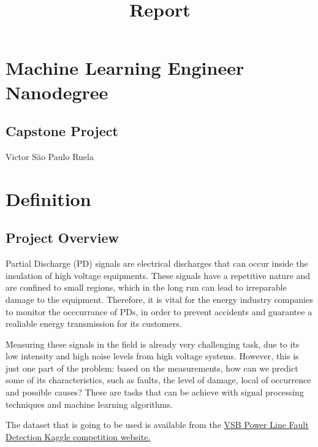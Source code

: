 \documentclass[11pt]{article}
\title{Report}
\begin{document}
    
    
    \maketitle
    
    

    
    \hypertarget{machine-learning-engineer-nanodegree}{%
\section*{Machine Learning Engineer
Nanodegree}\label{machine-learning-engineer-nanodegree}}

\hypertarget{capstone-project}{%
\subsection*{Capstone Project}\label{capstone-project}}

Victor São Paulo Ruela

\hypertarget{i.-definition}{%
\section{Definition}\label{i.-definition}}

\hypertarget{project-overview}{%
\subsection{Project Overview}\label{project-overview}}

Partial Discharge (PD) signals are electrical discharges that can occur
inside the insulation of high voltage equipments. These signals have a
repetitive nature and are confined to small regions, which in the long
run can lead to irreparable damage to the equipment. Therefore, it is
vital for the energy industry companies to monitor the occcurrance of
PDs, in order to prevent accidents and guarantee a realiable energy
transmission for its customers.

Measuring these signals in the field is already very challenging task,
due to its low intensity and high noise levels from high voltage
systems. However, this is just one part of the problem: based on the
measurements, how can we predict some of its characteristics, such as
faults, the level of damage, local of occurrence and possible causes?
These are tasks that can be achieve with signal processing techniques
and machine learning algorithms.

The dataset that is going to be used is available from the \href{https://www.kaggle.com/c/vsb-power-line-fault-detection}
{VSB Power Line Fault Detection Kaggle competition website.}
\end{document}
